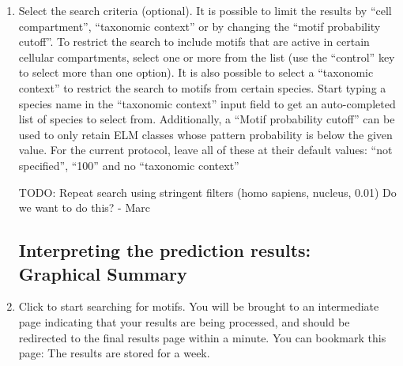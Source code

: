 \begin{enumerate}
\item Select the search criteria (optional). It is possible to limit the
	results by ``cell compartment'', ``taxonomic context'' or by changing
	the ``motif probability cutoff''. To restrict the search to include
	motifs that are active in certain cellular compartments, select one or
	more from the list (use the ``control'' key to select more than one
	option). It is also possible to select a ``taxonomic context'' to
	restrict the search to motifs from certain species. Start typing a
	species name in the ``taxonomic context'' input field to get an
	auto-completed list of species to select from. Additionally, a ``Motif
	probability cutoff'' can be used to only retain ELM classes whose
	pattern probability is below the given value. For the current protocol,
	leave all of these at their default values: ``not specified'', ``100''
	and no ``taxonomic context''

TODO: Repeat search using stringent filters (homo sapiens, nucleus,
0.01) Do we want to do this? - Marc

%
%

\subsection{Interpreting the prediction results: Graphical Summary}
\label{subsec:predicting_p53_graphical_summary}

\item Click  to start searching for motifs. You will be brought
	to an intermediate page indicating that your results are being
	processed, and should be redirected to the final results page
	within a minute. You can bookmark this page: The results are stored for
	a week.



\end{enumerate}

